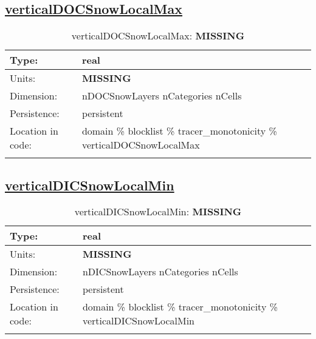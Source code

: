 \subsection[verticalDOCSnowLocalMax]{\hyperref[sec:var_tab_tracer_monotonicity]{verticalDOCSnowLocalMax}}
\label{subsec:var_sec_tracer_monotonicity_verticalDOCSnowLocalMax}
\begin{center}
\begin{longtable}{| p{2.0in} | p{4.0in} |}
        \hline 
        Type: & real \\
        \hline 
        Units: & {\bf \color{red} MISSING} \\
        \hline 
        Dimension: & nDOCSnowLayers nCategories nCells \\
        \hline 
        Persistence: & persistent \\
        \hline 
         Location in code: & domain \% blocklist \% tracer\_monotonicity \% verticalDOCSnowLocalMax \\
         \hline 
    \caption{verticalDOCSnowLocalMax: {\bf \color{red} MISSING}}
\end{longtable}
\end{center}
\subsection[verticalDICSnowLocalMin]{\hyperref[sec:var_tab_tracer_monotonicity]{verticalDICSnowLocalMin}}
\label{subsec:var_sec_tracer_monotonicity_verticalDICSnowLocalMin}
\begin{center}
\begin{longtable}{| p{2.0in} | p{4.0in} |}
        \hline 
        Type: & real \\
        \hline 
        Units: & {\bf \color{red} MISSING} \\
        \hline 
        Dimension: & nDICSnowLayers nCategories nCells \\
        \hline 
        Persistence: & persistent \\
        \hline 
         Location in code: & domain \% blocklist \% tracer\_monotonicity \% verticalDICSnowLocalMin \\
         \hline 
    \caption{verticalDICSnowLocalMin: {\bf \color{red} MISSING}}
\end{longtable}
\end{center}
